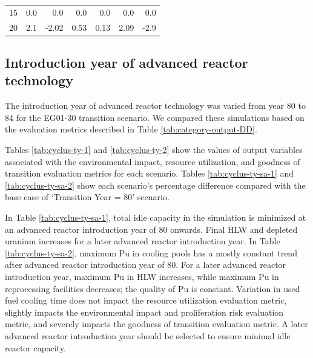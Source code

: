 \begin{table}[]
\begin{tabularx}{\textwidth}{R|RRRRRR}
        15 & 0.0              & 0.0                            & 0.0           & 0.0                         & 0.0               & 0.0                             \\
        20 & 2.1              & -2.02                          & 0.53          & 0.13                        & 2.09              & -2.9                           \\ \hline
                           \end{tabularx}%
    
    \end{table}


\subsection{Introduction year of advanced reactor technology}
The introduction year of advanced reactor technology
was varied from year 80 to 84 for the \Cyclus 
EG01-30 transition scenario. 
We compared these simulations based on the evaluation 
metrics described in Table \ref{tab:category-output-DD}.

Tables \ref{tab:cyclus-ty-1} and \ref{tab:cyclus-ty-2} show 
the values of 
output variables associated with the environmental impact, 
resource utilization, and goodness of transition evaluation 
metrics for each scenario. 
Tables \ref{tab:cyclus-ty-sa-1} and \ref{tab:cyclus-ty-sa-2} 
show each scenario's percentage 
difference compared with the base case of `Transition Year = 80'
scenario. 

In Table \ref{tab:cyclus-ty-sa-1}, total idle capacity 
in the simulation is minimized at an advanced reactor 
introduction year of 80 onwards. 
Final HLW and depleted uranium increases for a later 
advanced reactor introduction year.
In Table \ref{tab:cyclus-ty-sa-2}, maximum Pu in cooling 
pools has a mostly constant trend after advanced reactor 
introduction year of 80. 
For a later advanced reactor introduction year, 
maximum Pu in HLW increases, while maximum Pu in reprocessing facilities 
decreases; the quality of Pu is constant. 
Variation in used fuel cooling time does not impact the resource utilization
evaluation metric, slightly impacts the environmental 
impact and proliferation risk evaluation metric, and severely impacts the 
goodness of transition evaluation metric. 
A later advanced reactor introduction year should be 
selected to ensure minimal idle reactor capacity.

